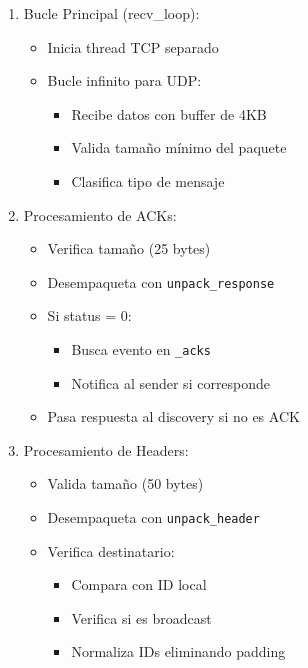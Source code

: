 \documentclass[12pt]{article}
\begin{document}
\begin{enumerate}
    \item Bucle Principal (recv\_loop):
    \begin{itemize}
        \item Inicia thread TCP separado
        \item Bucle infinito para UDP:
        \begin{itemize}
            \item Recibe datos con buffer de 4KB
            \item Valida tamaño mínimo del paquete
            \item Clasifica tipo de mensaje
        \end{itemize}
    \end{itemize}

    \item Procesamiento de ACKs:
    \begin{itemize}
        \item Verifica tamaño (25 bytes)
        \item Desempaqueta con \texttt{unpack\_response}
        \item Si status = 0:
        \begin{itemize}
            \item Busca evento en \texttt{\_acks}
            \item Notifica al sender si corresponde
        \end{itemize}
        \item Pasa respuesta al discovery si no es ACK
    \end{itemize}

    \item Procesamiento de Headers:
    \begin{itemize}
        \item Valida tamaño (50 bytes)
        \item Desempaqueta con \texttt{unpack\_header}
        \item Verifica destinatario:
        \begin{itemize}
            \item Compara con ID local
            \item Verifica si es broadcast
            \item Normaliza IDs eliminando padding
        \end{itemize}
    \end{itemize}


\end{enumerate}
\end{document}
